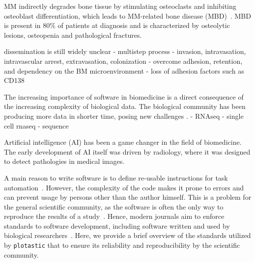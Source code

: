 MM indirectly degrades bone tissue by stimulating osteoclasts and
inhibiting osteoblast differentiation, which leads to MM-related bone
disease (MBD)~\cite{glaveyProteomicCharacterizationHuman2017}. MBD is
present in 80\% of patients at diagnosis and is characterized by
osteolytic lesions, osteopenia and pathological fractures.
\cite{terposPathogenesisBoneDisease2018}


dissemination is still widely unclear
- multistep process
- invasion, intravasation, intravascular arrest, extravasation,
colonization
- overcome adhesion, retention, and dependency on the BM
microenvironment
- loss of adhesion factors such as CD138

\newpage



The increasing importance of software in biomedicine is a direct
consequence of the increasing complexity of biological data. The
biological community has been producing more data in shorter time,
posing new challenges \cite{yangScalabilityValidationBig2017}.
- RNAseq
- single cell rnaseq
- sequence

Artificial intelligence (AI) has been a game changer in the field of
biomedicine. The early development of AI itself was driven by radiology,
where it was designed to detect pathologies in medical images.


A main reason to write software is to define re-usable instructions for
task automation~\cite{narztReusabilityConceptProcess1998}. However, the
complexity of the code makes it prone to errors and can prevent usage by
persons other than the author himself. This is a problem for the general
scientific community, as the software is often the only way to reproduce
the results of a study~\cite{sandveTenSimpleRules2013}. Hence, modern
journals aim to enforce standards to software development, including
software written and used by biological
researchers~\cite{smithJournalOpenSource2018}. Here, we provide a brief
overview of the standards utilized by \texttt{plotastic} that to ensure
its reliability and reproducibility by the scientific community.

